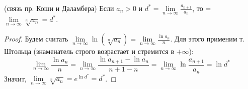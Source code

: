 \begin{theorem} (связь пр. Коши и Даламбера)
    Если $a_n > 0$ и $d^* = \lim\limits_{n \to \infty} \frac{a_{n+1}}{a_n}$, то  = $\lim\limits_{n \to \infty} \sqrt[n]{a_n} = d^*$.
\end{theorem}
\begin{proof}
    Будем считать $\lim\limits_{n \to \infty} \ln(\sqrt[n]{a_n}) = \lim\limits_{n \to \infty} \frac{\ln a_n}{n}$.
    Для этого применим т. Штольца (знаменатель строго возрастает и стремится в $+\infty$): \[ \lim\limits_{n \to \infty} \frac{\ln a_n}{n} = \lim\limits_{n \to \infty} \frac{\ln a_{n+1} - \ln a_n}{n + 1 - n} = \lim\limits_{n \to \infty} \ln \frac{a_{n+1}}{a_n} = \ln d^* \]
    \quad Значит, $\lim\limits_{n \to \infty} \sqrt[n]{a_n} = e^{\ln d^*} = d^*$.
\end{proof}
